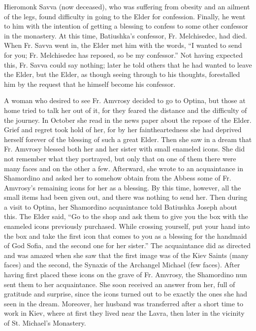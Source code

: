 Hieromonk Savva (now deceased), who was suffering from obesity and an ailment of the legs, found difficulty in going to the Elder for confession. Finally, he went to him with the intention of getting a blessing to confess to some other confessor in the monastery. At this time, Batiushka's confessor, Fr. Melchisedec, had died. When Fr. Savva went in, the Elder met him with the words, “I wanted to send for you; Fr. Melchisedec has reposed, so be my confessor.” Not having expected this, Fr. Savva could say nothing; later he told others that he had wanted to leave the Elder, but the Elder, as though seeing through to his thoughts, forestalled him by the request that he himself become his confessor.

A woman who desired to see Fr. Amvrosy decided to go to Optina, but those at home tried to talk her out of it, for they feared the distance and the difficulty of the journey. In October she read in the news paper about the repose of the Elder. Grief and regret took hold of her, for by her faintheartedness she had deprived herself forever of the blessing of such a great Elder. Then she saw in a dream that Fr. Amvrosy blessed both her and her sister with small enameled icons. She did not remember what they portrayed, but only that on one of them there were many faces and on the other a few. Afterward, she wrote to an acquaintance in Shamordino and asked her to somehow obtain from the Abbess some of Fr. Amvrosy's remaining icons for her as a blessing. By this time, however, all the small items had been given out, and there was nothing to send her. Then during a visit to Optina, her Shamordino acquaintance told Batiushka Joseph about this. The Elder said, “Go to the shop and ask them to give you the box with the enameled icons previously purchased. While crossing yourself, put your hand into the box and take the first icon that comes to you as a blessing for the handmaid of God Sofia, and the second one for her sister.” The acquaintance did as directed and was amazed when she saw that the first image was of the Kiev Saints (many faces) and the second, the Synaxis of the Archangel Michael (few faces). After having first placed these icons on the grave of Fr. Amvrosy, the Shamordino nun sent them to her acquaintance. She soon received an answer from her, full of gratitude and surprise, since the icons turned out to be exactly the ones she had seen in the dream. Moreover, her husband was transferred after a short time to work in Kiev, where at first they lived near the Lavra, then later in the vicinity of St. Michael's Monastery.

